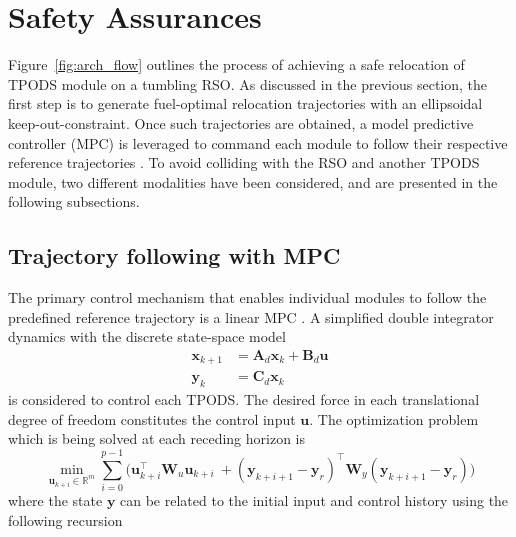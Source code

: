 \section{Safety Assurances}
Figure~\ref{fig:arch_flow} outlines the process of achieving a safe relocation of TPODS module on a tumbling RSO. As discussed in the previous section, the first step is to generate fuel-optimal relocation trajectories with an ellipsoidal keep-out-constraint. Once such trajectories are obtained, a model predictive controller (MPC) is leveraged to command each module to follow their respective reference trajectories \cite{parikh2024rapidtrajectoryoptimizationcontrol}. To avoid colliding with the RSO and another TPODS module, two different modalities have been considered, and are presented in the following subsections.

\subsection{Trajectory following with MPC}
The primary control mechanism that enables individual modules to follow the predefined reference trajectory is a linear MPC \cite{parikh2024rapidtrajectoryoptimizationcontrol}. A simplified double integrator dynamics with the discrete state-space model
\begin{align}\label{eq:EOM_d}
    \bm{x}_{k+1} &= \boldsymbol{A}_d\boldsymbol{x}_k + \boldsymbol{B}_d\boldsymbol{u} \\
    \bm{y}_{k} &=  \boldsymbol{C}_d\boldsymbol{x}_k
\end{align}
is considered to control each TPODS. The desired force in each translational degree of freedom constitutes the control input $\boldsymbol{u}$. The optimization problem which is being solved at each receding horizon is 
\begin{equation}\label{eq:L2_min}
    \min_{\boldsymbol{u}_{k+i}\in \mathbb{R}^{m}} \sum_{i=0}^{p-1} \Big(\boldsymbol{u}^{\top}_{k+i}\boldsymbol{W}_u\boldsymbol{u}_{k+i}\ +  \left(\boldsymbol{y}_{k+i+1}-\boldsymbol{y}_r\right)^{\top}\boldsymbol{W}_y\left(\boldsymbol{y}_{k+i+1}-\boldsymbol{y}_r\right)\Big)
\end{equation}
where the state $\boldsymbol{y}$ can be related to the initial input and control history using the following recursion
